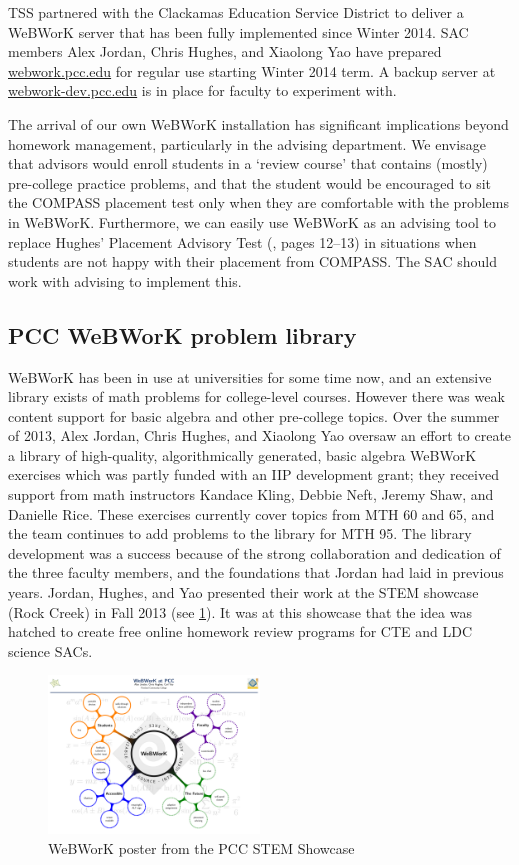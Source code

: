 TSS partnered with the Clackamas Education Service District to deliver a WeBWorK
server that has been fully implemented since Winter 2014.  SAC members Alex Jordan,
Chris Hughes, and Xiaolong Yao have prepared
\href{http://webwork.pcc.edu}{webwork.pcc.edu} for regular use starting Winter
2014 term. A backup server at
\href{http://webwork-dev.pcc.edu}{webwork-dev.pcc.edu} is in place for faculty
to experiment with. 

The arrival of our own WeBWorK installation has significant implications beyond
homework management, particularly in the advising department. We envisage that
advisors would enroll students in a `review course' that contains (mostly)
pre-college practice problems, and that the student would be encouraged to sit
the COMPASS placement test only when they are comfortable with the problems in
WeBWorK. Furthermore, we can easily use WeBWorK as an advising tool to replace
Hughes' Placement Advisory Test (\cite{mathprogramreview2003}, pages 12--13) in situations when students are not happy with
their placement from COMPASS.  The SAC should work with advising to implement
this. 

\subsection{PCC WeBWorK problem library}
WeBWorK has been in use at universities for some time now, and an extensive
library exists of math problems for college-level courses. However there was
weak content support for basic algebra and other pre-college topics. Over the summer
of 2013, Alex Jordan, Chris Hughes, and Xiaolong Yao oversaw an effort to create
a library of high-quality, algorithmically generated, basic algebra WeBWorK
exercises which was partly funded with an IIP development grant; they received
support from math instructors Kandace Kling, Debbie Neft, Jeremy Shaw, and Danielle Rice.  These
exercises currently cover topics from MTH 60 and 65, and the team continues to
add problems to the library for MTH 95. The library development was a success
because of the strong collaboration and dedication of the three faculty members,
and the foundations that Jordan had laid in previous years. Jordan, Hughes,
and Yao presented their work at the STEM showcase (Rock Creek) in Fall 2013 (see
\cref{webworkposter}). It was at this showcase that the idea was hatched to
create free online homework review programs for CTE and LDC science SACs.

\begin{figure}[!htb]
	\centering
	\includegraphics[width=0.5\textwidth]{webworkposter.pdf}
	\caption{WeBWorK poster from the PCC STEM Showcase}\label{webworkposter}
\end{figure}

